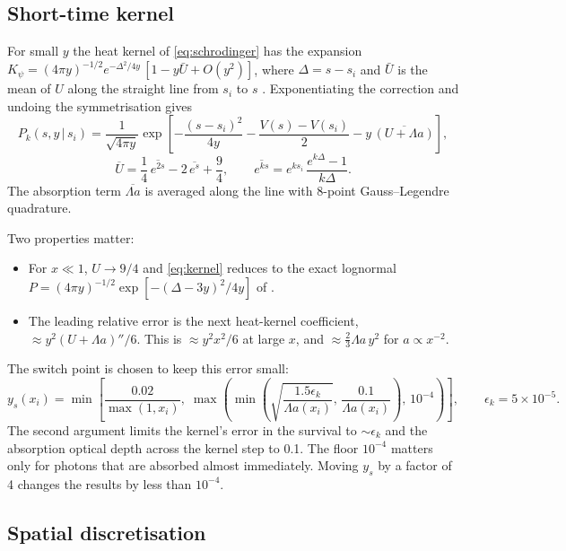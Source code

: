 \documentclass[11pt]{article}
\begin{document}
\subsection{Short-time kernel}\label{sec:kernel}

For small $y$ the heat kernel of \eqref{eq:schrodinger} has the expansion
$K_\psi = (4\pi y)^{-1/2}e^{-\Delta^2/4y}\,[1 - y\bar U + O(y^2)]$, where
$\Delta=s-s_i$ and $\bar U$ is the mean of $U$ along the straight line from
$s_i$ to $s$ \citep[e.g.][]{vassilevich2003}. Exponentiating the correction
and undoing the symmetrisation gives
\begin{equation}\label{eq:kernel}
  P_k(s,y\,|\,s_i) = \frac{1}{\sqrt{4\pi y}}
  \exp\!\left[-\frac{(s-s_i)^2}{4y}
  -\frac{V(s)-V(s_i)}{2} - y\,\overline{(U+\Lambda a)}\right],
\end{equation}
\begin{equation}
  \overline{U} = \frac14\,\overline{e^{2s}} - 2\,\overline{e^{s}} + \frac94,
  \qquad
  \overline{e^{ks}} = e^{ks_i}\,\frac{e^{k\Delta}-1}{k\Delta}.
\end{equation}
The absorption term $\overline{\Lambda a}$ is averaged along the line with
8-point Gauss--Legendre quadrature.

Two properties matter:
\begin{itemize}
\item For $x\ll1$, $U\to9/4$ and \eqref{eq:kernel} reduces to the exact
  lognormal $P=(4\pi y)^{-1/2}\exp[-(\Delta-3y)^2/4y]$ of
  \citet{zeldovich1969}.
\item The leading relative error is the next heat-kernel coefficient,
  $\approx y^2(U+\Lambda a)''/6$. This is $\approx y^2x^2/6$ at large $x$,
  and $\approx\frac23\Lambda a\,y^2$ for $a\propto x^{-2}$.
\end{itemize}
The switch point is chosen to keep this error small:
\begin{equation}
  y_s(x_i) = \min\!\left[\frac{0.02}{\max(1,x_i)},\;
  \max\!\left(\min\!\left(\sqrt{\frac{1.5\epsilon_k}{\Lambda a(x_i)}},\,
  \frac{0.1}{\Lambda a(x_i)}\right),\,10^{-4}\right)\right],
  \qquad \epsilon_k=5\times10^{-5}.
\end{equation}
The second argument limits the kernel's error in the survival to
$\sim\epsilon_k$ and the absorption optical depth across the kernel step to
0.1. The floor $10^{-4}$ matters only for photons that are absorbed almost
immediately. Moving $y_s$ by a factor of 4 changes the results by less than
$10^{-4}$.

\subsection{Spatial discretisation}
\end{document}
